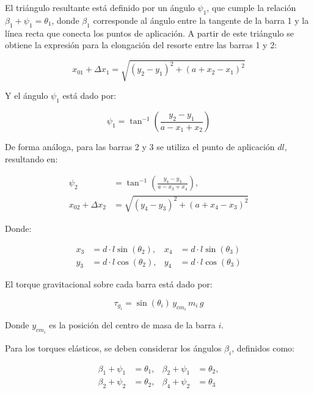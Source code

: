 El triángulo resultante está definido por un ángulo \(\psi_1\), que cumple la relación \(\beta_1 + \psi_1 = \theta_1\), donde \(\beta_1\) corresponde al ángulo entre la tangente de la barra 1 y la línea recta que conecta los puntos de aplicación. A partir de este triángulo se obtiene la expresión para la elongación del resorte entre las barras 1 y 2:

\begin{equation}
x_{01} + \Delta x_{1} = \sqrt{(y_2 - y_1)^2 + (a + x_2 - x_1)^2}
\end{equation}

Y el ángulo \(\psi_1\) está dado por:

\begin{equation}
\psi_1 = \tan^{-1}\left( \frac{y_2 - y_1}{a - x_1 + x_2} \right)
\end{equation}

De forma análoga, para las barras 2 y 3 se utiliza el punto de aplicación \(dl\), resultando en:

\begin{align}
\psi_2 &= \tan^{-1} \left( \frac{y_4 - y_3}{a - x_3 + x_4} \right), \\
x_{02} + \Delta x_{2} &= \sqrt{(y_4 - y_3)^2 + (a + x_4 - x_3)^2}
\end{align}

Donde:

\begin{align}
x_3 &= d \cdot l \sin(\theta_{2}), & x_4 &= d \cdot l \sin(\theta_{3}) \\
y_3 &= d \cdot l \cos(\theta_{2}), & y_4 &= d \cdot l \cos(\theta_{3})
\end{align}

El torque gravitacional sobre cada barra está dado por:

\begin{equation}
\tau_{g_i} = \sin(\theta_i) \, y_{cm_i} \, m_i \, g
\end{equation}

Donde \(y_{cm_i}\) es la posición del centro de masa de la barra \(i\).

Para los torques elásticos, se deben considerar los ángulos \(\beta_i\), definidos como:

\begin{align}
\beta_1 + \psi_1 &= \theta_1, & \beta_2 + \psi_1 &= \theta_2, \\
\beta_2 + \psi_2 &= \theta_2, & \beta_4 + \psi_2 &= \theta_3
\end{align}

